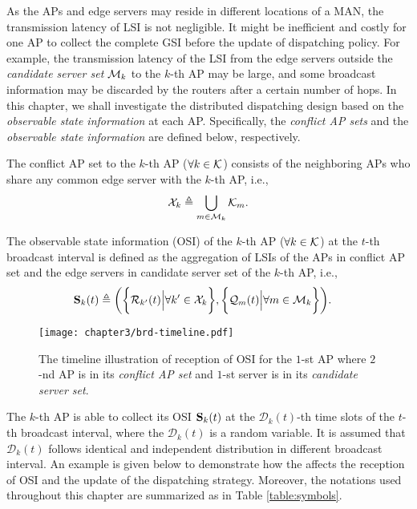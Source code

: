 As the APs and edge servers may reside in different locations of a MAN, the transmission latency of LSI is not negligible.
It might be inefficient {and costly} for one AP to collect the complete GSI before the update of dispatching policy.
For example, the transmission latency of the LSI from the edge servers outside the \emph{candidate server set} $\mathcal{M}_{k}$ to the $k$-th AP may be large, and some broadcast information may be discarded by the routers after a certain number of hops.
In this chapter, we shall investigate the distributed dispatching design based on the \emph{observable state information} at each AP.
Specifically, the \emph{conflict AP sets} and the \emph{observable state information} are defined below, respectively.
\begin{definition}
    The conflict AP set to the $k$-th AP ($\forall k\in\mathcal{K}$) consists of the neighboring APs who share any common edge server with the $k$-th AP, i.e.,
    \begin{align}
        \mathcal{X}_{k} \triangleq \bigcup_{m\in\mathcal{M}_{k}} \mathcal{K}_{m}.
    \end{align}
\end{definition}

\begin{definition}
    \label{def:OSI}
    The observable state information (OSI) of the $k$-th AP ($\forall k\in\mathcal{K}$) at the $t$-th broadcast interval is defined as the aggregation of LSIs of the APs in {conflict AP set} and the edge servers in {candidate server set} of the $k$-th AP, i.e.,
    \begin{align}
        \mathbf{S}_{k}(t) &\triangleq
        \bigg(
            \bigg\{\mathcal{R}_{k'}(t) \Big| \forall k'\in\mathcal{X}_{k}\bigg\},
            \bigg\{\mathcal{Q}_{m}(t) \Big| \forall m\in\mathcal{M}_{k}\bigg\}
        \bigg).
    \end{align}
\end{definition}

\begin{figure*}[t]
    \centering
    \texttt{[image: chapter3/brd-timeline.pdf]}
    \caption{The timeline illustration of reception of OSI for the $1$-st AP where $2$-nd AP is in its \emph{conflict AP set} and $1$-st server is in its \emph{candidate server set}.}
    \label{fig:brd_timeline}
\end{figure*}

The $k$-th AP is able to collect its OSI $\mathbf{S}_{k}(t)$ at the $\mathcal{D}_{k}(t)$-th time slots of the $t$-th broadcast interval, where the {\emph{\brlatency}} $\mathcal{D}_{k}(t)$ is a random variable.
It is assumed that $\mathcal{D}_{k}(t)$ follows identical and independent distribution in different broadcast interval.
An example is given below to demonstrate how the {\brlatency} affects the reception of OSI and the update of the dispatching strategy.
Moreover, the notations used throughout this chapter are summarized as in Table \ref{table:symbols}.

